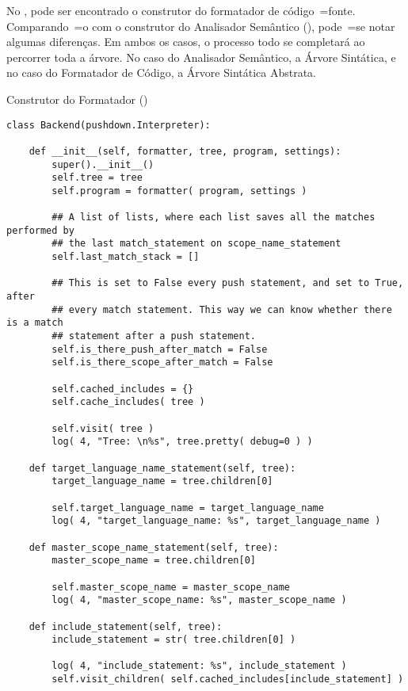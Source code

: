 No ,
pode ser encontrado o construtor do formatador de código~=fonte.
Comparando~=o com o construtor do Analisador Semântico (),
pode~=se notar algumas diferenças.
Em ambos os casos,
o processo todo se completará ao percorrer toda a árvore.
No caso do Analisador Semântico,
a Árvore Sintática,
e no caso do Formatador de Código,
a Árvore Sintática Abstrata.
\begin{code}
\caption[Construtor do Formatador]{Construtor do Formatador ()}
\label{code:construtorDoFormatador}
\begin{verbatim}
class Backend(pushdown.Interpreter):

    def __init__(self, formatter, tree, program, settings):
        super().__init__()
        self.tree = tree
        self.program = formatter( program, settings )

        ## A list of lists, where each list saves all the matches performed by
        ## the last match_statement on scope_name_statement
        self.last_match_stack = []

        ## This is set to False every push statement, and set to True, after
        ## every match statement. This way we can know whether there is a match
        ## statement after a push statement.
        self.is_there_push_after_match = False
        self.is_there_scope_after_match = False

        self.cached_includes = {}
        self.cache_includes( tree )

        self.visit( tree )
        log( 4, "Tree: \n%s", tree.pretty( debug=0 ) )

    def target_language_name_statement(self, tree):
        target_language_name = tree.children[0]

        self.target_language_name = target_language_name
        log( 4, "target_language_name: %s", target_language_name )

    def master_scope_name_statement(self, tree):
        master_scope_name = tree.children[0]

        self.master_scope_name = master_scope_name
        log( 4, "master_scope_name: %s", master_scope_name )

    def include_statement(self, tree):
        include_statement = str( tree.children[0] )

        log( 4, "include_statement: %s", include_statement )
        self.visit_children( self.cached_includes[include_statement] )
\end{verbatim}
\end{code}

